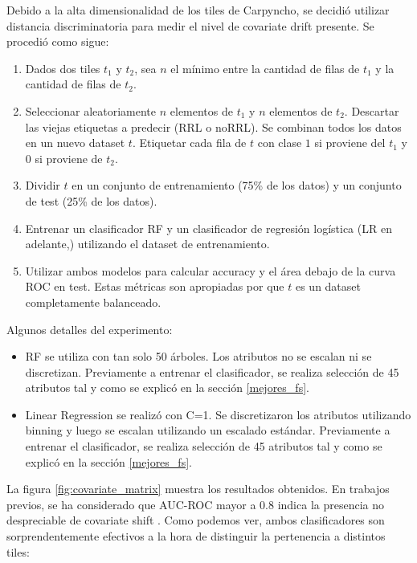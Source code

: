 Debido a la alta dimensionalidad de los tiles de Carpyncho, se decidió utilizar distancia discriminatoria para medir el nivel de covariate drift presente. Se procedió como sigue:

\begin{enumerate}
\item Dados dos tiles $t_1$ y $t_2$, sea $n$ el mínimo entre la cantidad de filas de $t_1$ y la cantidad de filas de $t_2$. 
\item Seleccionar aleatoriamente $n$ elementos de $t_1$ y $n$ elementos de $t_2$. Descartar las viejas etiquetas a predecir (RRL o noRRL). Se combinan todos los datos en un nuevo dataset $t$. Etiquetar cada fila de $t$ con clase $1$ si proviene del $t_1$ y $0$ si proviene de $t_2$. 
\item Dividir $t$ en un conjunto de entrenamiento (75\% de los datos) y un conjunto de test (25\% de los datos).
\item Entrenar un clasificador RF y un clasificador de regresión logística (LR en adelante,\cite{statisticallearning}) utilizando el dataset de entrenamiento.
\item Utilizar ambos modelos para calcular accuracy y el área debajo de la curva ROC en test. Estas métricas son apropiadas por que $t$ es un dataset completamente balanceado.
\end{enumerate}

Algunos detalles del experimento:

\begin{itemize}
\item RF se utiliza con tan solo 50 árboles. Los atributos no se escalan ni se discretizan. Previamente a entrenar el clasificador, se realiza selección de 45 atributos tal y como se explicó en la sección \ref{mejores_fs}.
\item Linear Regression se realizó con C=1. Se discretizaron los atributos utilizando binning y luego se escalan utilizando un escalado estándar. Previamente a entrenar el clasificador, se realiza selección de 45 atributos tal y como se explicó en la sección \ref{mejores_fs}.
\end{itemize}

La figura \ref{fig:covariate_matrix} muestra los resultados obtenidos. En trabajos previos, se ha considerado que AUC-ROC mayor a 0.8 indica la presencia no despreciable de covariate shift \cite{GeetaDharani2019CovariateSA}. Como podemos ver, ambos clasificadores son sorprendentemente efectivos a la hora de distinguir la pertenencia a distintos tiles:

